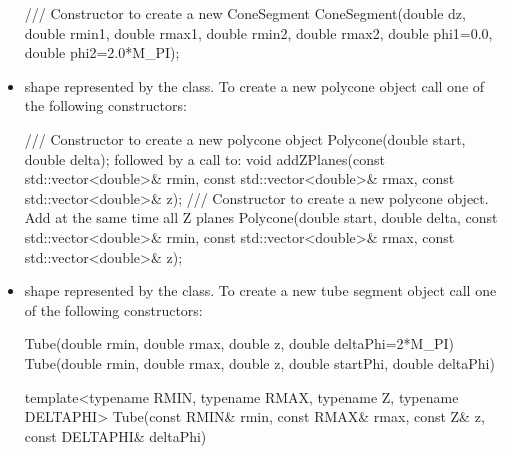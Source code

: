 \documentclass[10pt,a4paper]{article}
\begin{document}
\begin{itemize}
\begin{code}
/// Constructor to create a new ConeSegment
ConeSegment(double dz, double rmin1, double rmax1, double rmin2, double rmax2, 
            double phi1=0.0, double phi2=2.0*M_PI);
\end{code}
\item {}  shape
    represented by the  class. To create a new polycone
    object call one of the following constructors:
\begin{code}
/// Constructor to create a new polycone object
Polycone(double start, double delta);
followed by a call to:
void addZPlanes(const std::vector<double>& rmin, 
                const std::vector<double>& rmax,
                const std::vector<double>& z);
/// Constructor to create a new polycone object. Add at the same time all Z planes
Polycone(double start, double delta, 
         const std::vector<double>& rmin, 
         const std::vector<double>& rmax, 
         const std::vector<double>& z);
\end{code}
\item {} shape
    represented by the  class. To create a new tube segment
    object call one of the following constructors:
\begin{code}
Tube(double rmin, double rmax, double z, double deltaPhi=2*M_PI)
Tube(double rmin, double rmax, double z, double startPhi, double deltaPhi)

template<typename RMIN, typename RMAX, typename Z, typename DELTAPHI>
Tube(const RMIN& rmin, const RMAX& rmax, const Z& z, const DELTAPHI& deltaPhi)  


\end{code}
\end{itemize}
\end{document}
